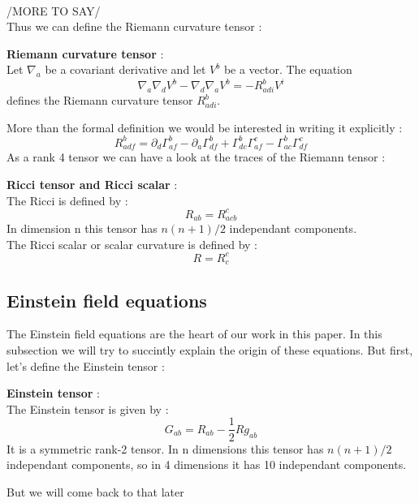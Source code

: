\documentclass[a4paper,12pt]{article}
\theoremstyle{definition}
\begin{document}
\\/MORE TO SAY/\\
Thus we can define the Riemann curvature tensor :
\begin{definition}
	\textbf{Riemann curvature tensor} :\\
	Let $\nabla_a$ be a covariant derivative and let $V^b$ be a vector. The equation
	\begin{equation}
		\nabla _a \nabla _d V^b - \nabla _d \nabla _aV^b=-R_{adi}^b V^i
	\end{equation}
	defines the Riemann curvature tensor $R_{adi}^b$.
\end{definition}
More than the formal definition we would be interested in writing it explicitly :
\begin{equation} \label{Riemm}
	R_{adf}^b=\partial_d\Gamma^b_{af}-\partial_a\Gamma^b_{df}+\Gamma^b_{dc}\Gamma^c_{af}-\Gamma^b_{ac}\Gamma^c_{df}
\end{equation}
As a rank 4 tensor we can have a look at the traces of the Riemann tensor :
\begin{definition}
	\textbf{Ricci tensor and Ricci scalar} :\\
	The Ricci is defined by :
	\begin{equation}\label{Ricc}
		R_{ab}=R_{acb}^c
	\end{equation}
	In dimension n this tensor has $n(n+1)/2$ independant components.\\
	The Ricci scalar or scalar curvature is defined by :
	\begin{equation}
		R=R_c^c
	\end{equation}
\end{definition}
\subsection{Einstein field equations}
The Einstein field equations are the heart of our work in this paper.
In this subsection we will try to succintly explain the origin of these equations.
But first, let's define the Einstein tensor : 
\begin{definition}
	\textbf{Einstein tensor} :\\
	The Einstein tensor is given by :
	\begin{equation}
		G_{ab}=R_{ab}-\frac{1}{2}Rg_{ab}
	\end{equation}
	It is a symmetric rank-2 tensor. In n dimensions this tensor has $n(n+1)/2$ independant components, so in 4 dimensions it has 10 independant components.
\end{definition}
But we will come back to that later
\end{document}
